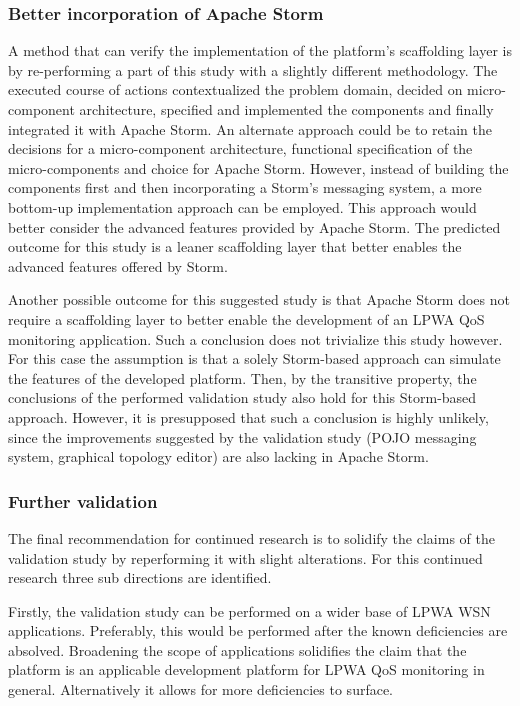\subsubsection{Better incorporation of Apache Storm}
A method that can verify the implementation of the  platform's scaffolding layer is by re-performing a part of this study with a slightly different methodology. The executed course of actions contextualized the problem domain, decided on micro-component architecture, specified and implemented the components and finally integrated it with Apache Storm. An alternate approach could be to retain the decisions for a micro-component architecture, functional specification of the micro-components and choice for Apache Storm. However, instead of building the components first and then incorporating a Storm's messaging system, a more bottom-up implementation approach can be employed. This approach would better consider the advanced features provided by Apache Storm. The predicted outcome for this study is a leaner scaffolding layer that better enables the advanced features offered by Storm. 

Another possible outcome for this suggested study is that Apache Storm does not require a scaffolding layer to better enable the development of an LPWA QoS monitoring application. Such a conclusion does not trivialize this study however. For this case the assumption is that a solely Storm-based approach can simulate the features of the developed platform. Then, by the transitive property, the conclusions of the performed validation study also hold for this Storm-based approach. However, it is presupposed that such a conclusion is highly unlikely, since the improvements suggested by the validation study (POJO messaging system, graphical topology editor) are also lacking in Apache Storm.

\subsubsection{Further validation}
The final recommendation for continued research is to solidify the claims of the validation study by reperforming it with slight alterations. For this continued research three sub directions are identified. 

Firstly, the validation study can be performed on a wider base of LPWA WSN applications. Preferably, this would be performed after the known deficiencies are absolved. Broadening the scope of applications solidifies the claim that the platform is an applicable development platform for LPWA QoS monitoring in general. Alternatively it allows for more deficiencies to surface.


